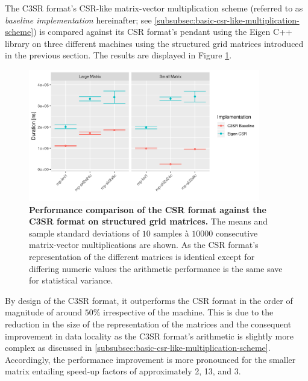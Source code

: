 \documentclass{article}
\begin{document}
    The C3SR format's CSR-like matrix-vector multiplication scheme (referred to as \emph{baseline implementation} hereinafter; see \ref{subsubsec:basic-csr-like-multiplication-scheme}) is compared against its CSR format's pendant using the Eigen C++ library \cite{eigen:website} on three different machines using the structured grid matrices introduced in the previous section. The results are displayed in Figure \ref{fig:baseline_arithmetic_performance}.

    \begin{figure}[!ht]
      \centering
      \includegraphics[width=0.9\textwidth]{assets/eigen_vs_c3sr_baseline}
      \caption[Performance comparison of the CSR format against the C3SR format on structured grid matrices.]{\textbf{Performance comparison of the CSR format against the C3SR format on structured grid matrices.} The means and sample standard deviations of $10$ samples à $10000$ consecutive matrix-vector multiplications are shown. As the CSR format's representation of the different matrices is identical except for differing numeric values the arithmetic performance is the same save for statistical variance.}
      \label{fig:baseline_arithmetic_performance}
    \end{figure}

    By design of the C3SR format, it outperforms the CSR format in the order of magnitude of around $50\%$ irrespective of the machine. This is due to the reduction in the size of the representation of the matrices and the consequent improvement in data locality as the C3SR format's arithmetic is slightly more complex as discussed in \ref{subsubsec:basic-csr-like-multiplication-scheme}. Accordingly, the performance improvement is more pronounced for the smaller matrix entailing speed-up factors of approximately 2, 13, and 3.
\end{document}
